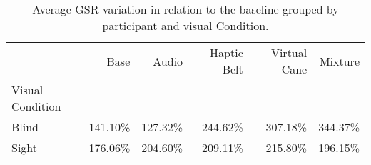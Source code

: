 
\begin{table}[!htb]
\centering
\caption{Average GSR variation in relation to the baseline grouped by participant and visual Condition.}
\label{tab:gsr_def}
\begin{tabular}{lrrrrr}
\toprule
{} &      Base &     Audio & Haptic Belt & Virtual Cane &   Mixture \\
Visual Condition &           &           &             &              &           \\
\midrule
Blind            &  141.10\% &  127.32\% &    244.62\% &     307.18\% &  344.37\% \\
Sight            &  176.06\% &  204.60\% &    209.11\% &     215.80\% &  196.15\% \\
\bottomrule
\end{tabular}
\end{table}

